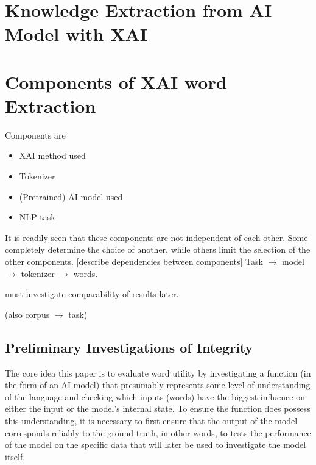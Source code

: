 \section{Knowledge Extraction from AI Model with XAI}


\section{Components of XAI word Extraction}
Components are
\begin{itemize}
	\item XAI method used
	\item Tokenizer
	\item (Pretrained) AI model used
	\item NLP task
\end{itemize}

It is readily seen that these components are not independent of each other.
Some completely determine the choice of another, while others limit the selection of the other components.
	[describe dependencies between components]
Task $\rightarrow$ model $\rightarrow$ tokenizer $\rightarrow$ words.

must investigate comparability of results later.

(also corpus $\rightarrow$ task)
\subsection{Preliminary Investigations of Integrity}
The core idea this paper is to evaluate word utility by investigating a function (in the form of an AI model) that presumably represents some level of understanding of the language and checking which inputs (words) have the biggest influence on either the input or the model's internal state.
To ensure the function does possess this understanding, it is necessary to first ensure that the output of the model corresponds reliably to the ground truth, in other words, to tests the performance of the model on the specific data that will later be used to investigate the model itself.



